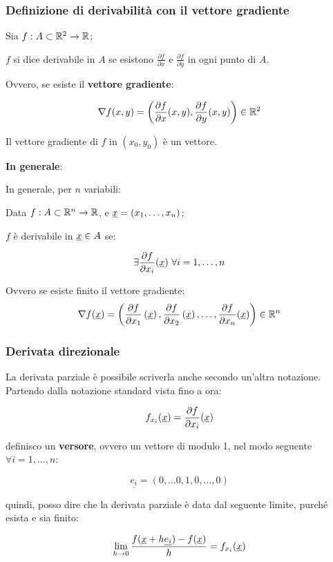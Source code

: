 \filbreak{}
\subsubsection{Definizione di derivabilità con il vettore gradiente}

Sia \(f: A \subset \mathbb{R}^2 \to \mathbb{R} \);

\(f\) si dice derivabile in \(A\) se esistono \(\frac{\partial f}{\partial x}\) e \(\frac{\partial f}{\partial y}\) in ogni punto di \(A\).

Ovvero, se esiste il \textbf{vettore gradiente}:

\[
    \nabla f(x,y)=\left( \frac{\partial f}{\partial x}(x,y), \frac{\partial f}{\partial y}(x,y) \right) \in \mathbb{R}^2
\]

Il vettore gradiente di \(f\) in \((x_0, y_0)\) è un vettore.

\textbf{In generale}:

In generale, per \(n\) variabili:

Data \(f: A \subset \mathbb{R}^n \to \mathbb{R} \), e \(\underline{x} = (x_1, \ldots, x_n)\);

\(f\) è derivabile in \(\underline{x} \in A\) se:

\[\exists \frac{\partial f}{\partial x_i}(\underline{x}) ~\forall i = 1,\ldots,n\]

Ovvero se esiste finito il vettore gradiente:
\[
    \nabla f(\underline{x} ) = \left( \frac{\partial f}{\partial x_1}\left(\underline{x}\right), \frac{\partial f}{\partial x_2}\left(\underline{x}\right), \ldots , \frac{\partial f}{\partial x_n}(\underline{x} ) \right) \in \mathbb{R}^{n}
\]

\filbreak{}
\subsubsection{Derivata direzionale}

La derivata parziale è possibile scriverla anche secondo un'altra notazione. Partendo dalla notazione standard vista fino a ora:

\[
    f_{x_i} (\underline{x} ) = \frac{\partial f}{\partial x_i}(\underline{x} )
\]

definisco un \textbf{versore}, ovvero un vettore di modulo 1, nel modo seguente \(\forall i = 1, \ldots ,n\):

\[
    \underline{e_i} = (0, \ldots 0,1,0,\ldots,0)
\]

quindi, posso dire che la derivata parziale è data dal seguente limite, purché esista e sia finito:

\[
    \lim_{ h \to 0 } \frac{f(\underline{x} + h \underline{e_i}) - f(\underline{x} )}{h} = f_{x_i}(\underline{x} )
\]

